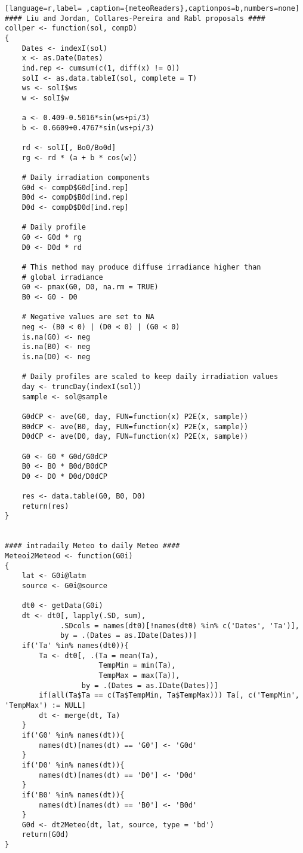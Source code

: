 \begin{lstlisting}[language=r,label= ,caption={meteoReaders},captionpos=b,numbers=none]
#### Liu and Jordan, Collares-Pereira and Rabl proposals ####
collper <- function(sol, compD)
{
    Dates <- indexI(sol)
    x <- as.Date(Dates)
    ind.rep <- cumsum(c(1, diff(x) != 0))
    solI <- as.data.tableI(sol, complete = T)
    ws <- solI$ws
    w <- solI$w

    a <- 0.409-0.5016*sin(ws+pi/3)
    b <- 0.6609+0.4767*sin(ws+pi/3)

    rd <- solI[, Bo0/Bo0d]
    rg <- rd * (a + b * cos(w))

    # Daily irradiation components
    G0d <- compD$G0d[ind.rep]
    B0d <- compD$B0d[ind.rep]
    D0d <- compD$D0d[ind.rep]

    # Daily profile
    G0 <- G0d * rg
    D0 <- D0d * rd

    # This method may produce diffuse irradiance higher than
    # global irradiance
    G0 <- pmax(G0, D0, na.rm = TRUE)
    B0 <- G0 - D0

    # Negative values are set to NA
    neg <- (B0 < 0) | (D0 < 0) | (G0 < 0)
    is.na(G0) <- neg
    is.na(B0) <- neg
    is.na(D0) <- neg

    # Daily profiles are scaled to keep daily irradiation values
    day <- truncDay(indexI(sol))
    sample <- sol@sample

    G0dCP <- ave(G0, day, FUN=function(x) P2E(x, sample))
    B0dCP <- ave(B0, day, FUN=function(x) P2E(x, sample))
    D0dCP <- ave(D0, day, FUN=function(x) P2E(x, sample))

    G0 <- G0 * G0d/G0dCP
    B0 <- B0 * B0d/B0dCP
    D0 <- D0 * D0d/D0dCP

    res <- data.table(G0, B0, D0)
    return(res)
}


#### intradaily Meteo to daily Meteo ####
Meteoi2Meteod <- function(G0i)
{
    lat <- G0i@latm
    source <- G0i@source

    dt0 <- getData(G0i)
    dt <- dt0[, lapply(.SD, sum), 
             .SDcols = names(dt0)[!names(dt0) %in% c('Dates', 'Ta')],
             by = .(Dates = as.IDate(Dates))]
    if('Ta' %in% names(dt0)){
        Ta <- dt0[, .(Ta = mean(Ta),
                      TempMin = min(Ta),
                      TempMax = max(Ta)),
                  by = .(Dates = as.IDate(Dates))]
        if(all(Ta$Ta == c(Ta$TempMin, Ta$TempMax))) Ta[, c('TempMin', 'TempMax') := NULL]
        dt <- merge(dt, Ta)
    }
    if('G0' %in% names(dt)){
        names(dt)[names(dt) == 'G0'] <- 'G0d'
    }
    if('D0' %in% names(dt)){
        names(dt)[names(dt) == 'D0'] <- 'D0d'
    }
    if('B0' %in% names(dt)){
        names(dt)[names(dt) == 'B0'] <- 'B0d'
    }
    G0d <- dt2Meteo(dt, lat, source, type = 'bd')
    return(G0d)
}


\end{lstlisting}
